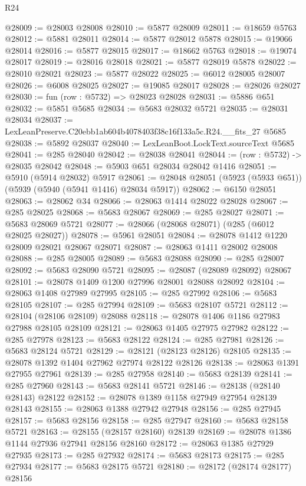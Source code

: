 \begin{lexlean}{R24}
\begin{coremodule}
@28009 := @28003 @28008
@28010 := @5877 @28009
@28011 := @18659 @5763
@28012 := @5881 @28011
@28014 := @5877 @28012 @5878
@28015 := @19066 @28014
@28016 := @5877 @28015
@28017 := @18662 @5763
@28018 := @19074 @28017
@28019 := @28016 @28018
@28021 := @5877 @28019 @5878
@28022 := @28010 @28021
@28023 := @5877 @28022
@28025 := @6012 @28005 @28007
@28026 := @6008 @28025
@28027 := @19085 @28017
@28028 := @28026 @28027
@28030 := fun (row : @5732) => @28023 @28028
@28031 := @5886 @651
@28032 := @5851 @5685
@28034 := @5683 @28032 @5721
@28035 := @28031 @28034
@28037 := LexLeanPreserve.C20ebb1ab604b4078403f38c16f133a5c.R24.__fits_27 @5685
@28038 := @5892 @28037
@28040 := LexLeanBoot.LockText.sourceText @5685
@28041 := @285 @28040
@28042 := @28038 @28041
@28044 := (row : @5732) -> @28035 @28042
@28048 := @5903 @651 @28034 @28042 @1416
@28051 := @5910 (@5914 @28032) @5917
@28061 := @28048 @28051 (@5923 (@5933 @651)) (@5939 (@5940 (@5941 @1416) @28034 @5917))
@28062 := @6150 @28051
@28063 := @28062 @34
@28066 := @28063 @1414 @28022 @28028
@28067 := @285 @28025
@28068 := @5683 @28067
@28069 := @285 @28027
@28071 := @5683 @28069 @5721
@28077 := @28066 (@28068 @28071) (@285 (@6012 @28025 @28027))
@28078 := @5961 @28051
@28084 := @28078 @1412 @1220 @28009 @28021 @28067 @28071
@28087 := @28063 @1411 @28002 @28008
@28088 := @285 @28005
@28089 := @5683 @28088
@28090 := @285 @28007
@28092 := @5683 @28090 @5721
@28095 := @28087 (@28089 @28092) @28067
@28101 := @28078 @1409 @1200 @27996 @28001 @28088 @28092
@28104 := @28063 @1408 @27989 @27995
@28105 := @285 @27992
@28106 := @5683 @28105
@28107 := @285 @27994
@28109 := @5683 @28107 @5721
@28112 := @28104 (@28106 @28109) @28088
@28118 := @28078 @1406 @1186 @27983 @27988 @28105 @28109
@28121 := @28063 @1405 @27975 @27982
@28122 := @285 @27978
@28123 := @5683 @28122
@28124 := @285 @27981
@28126 := @5683 @28124 @5721
@28129 := @28121 (@28123 @28126) @28105
@28135 := @28078 @1392 @1404 @27962 @27974 @28122 @28126
@28138 := @28063 @1391 @27955 @27961
@28139 := @285 @27958
@28140 := @5683 @28139
@28141 := @285 @27960
@28143 := @5683 @28141 @5721
@28146 := @28138 (@28140 @28143) @28122
@28152 := @28078 @1389 @1158 @27949 @27954 @28139 @28143
@28155 := @28063 @1388 @27942 @27948
@28156 := @285 @27945
@28157 := @5683 @28156
@28158 := @285 @27947
@28160 := @5683 @28158 @5721
@28163 := @28155 (@28157 @28160) @28139
@28169 := @28078 @1386 @1144 @27936 @27941 @28156 @28160
@28172 := @28063 @1385 @27929 @27935
@28173 := @285 @27932
@28174 := @5683 @28173
@28175 := @285 @27934
@28177 := @5683 @28175 @5721
@28180 := @28172 (@28174 @28177) @28156

\end{coremodule}
\end{lexlean}
